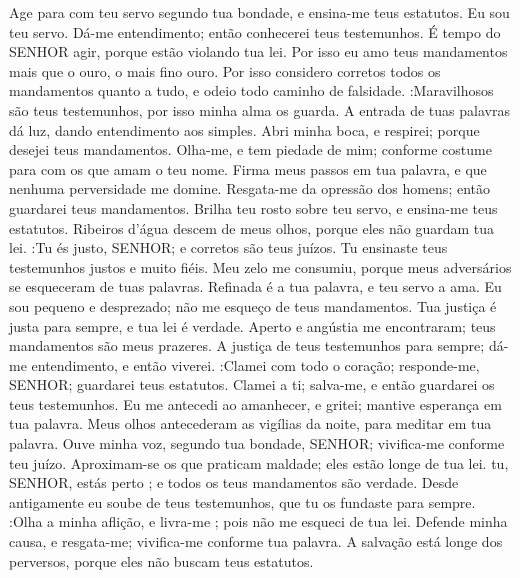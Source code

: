 {Age para com teu servo segundo tua bondade, e ensina-me teus estatutos.
Eu sou teu servo. Dá-me entendimento; então conhecerei teus testemunhos.
É tempo do SENHOR agir, porque estão violando tua lei.
Por isso eu amo teus mandamentos mais que o ouro, o mais fino ouro.
Por isso considero corretos todos os
{} mandamentos quanto a tudo, e odeio todo caminho de falsidade.
 :Maravilhosos são teus testemunhos, por isso minha alma os guarda.
A entrada de tuas palavras dá luz, dando entendimento aos simples.
Abri minha boca, e respirei; porque desejei teus mandamentos.
Olha-me, e tem piedade de mim; conforme
{} costume para com os que amam o teu nome.
Firma meus passos em tua palavra, e que nenhuma perversidade me domine.
Resgata-me da opressão dos homens; então guardarei teus mandamentos.
Brilha teu rosto sobre teu servo, e ensina-me teus estatutos.
Ribeiros d'água descem de meus olhos, porque eles não guardam tua lei.
 :Tu és justo, SENHOR; e corretos são teus juízos.
Tu ensinaste teus testemunhos justos e muito fiéis.
Meu zelo me consumiu, porque meus adversários se esqueceram de tuas palavras.
Refinada é a tua palavra, e teu servo a ama.
Eu sou pequeno e desprezado;
{} não me esqueço de teus mandamentos.
Tua justiça é justa para sempre, e tua lei é verdade.
Aperto e angústia me encontraram;
{} teus mandamentos são meus prazeres.
A justiça de teus testemunhos
{} para sempre; dá-me entendimento, e então viverei.
 :Clamei com todo o
{} coração; responde-me, SENHOR; guardarei teus estatutos.
Clamei a ti; salva-me, e então guardarei os teus testemunhos.
Eu me antecedi ao amanhecer, e gritei;
{} mantive esperança em tua palavra.
Meus olhos antecederam as vigílias da noite, para meditar em tua palavra.
Ouve minha voz, segundo tua bondade, SENHOR; vivifica-me conforme teu juízo.
Aproximam-se
{} os que praticam maldade; eles estão longe de tua lei.
 tu, SENHOR, estás perto
{} ; e todos os teus mandamentos são verdade.
Desde antigamente eu soube de teus testemunhos, que tu os fundaste para sempre.
 :Olha a minha aflição, e livra-me
{} ; pois não me esqueci de tua lei.
Defende minha causa, e resgata-me; vivifica-me conforme tua palavra.
A salvação está longe dos perversos, porque eles não buscam teus estatutos.
}
